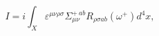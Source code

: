 \begin{equation}
I=i\int_X \varepsilon ^{\mu \nu \rho \sigma }
\Sigma_{\mu \nu }^{+\ ab}R_{\rho \sigma ab}(\omega^{+})d^4x,\label{accion3}
\end{equation}

